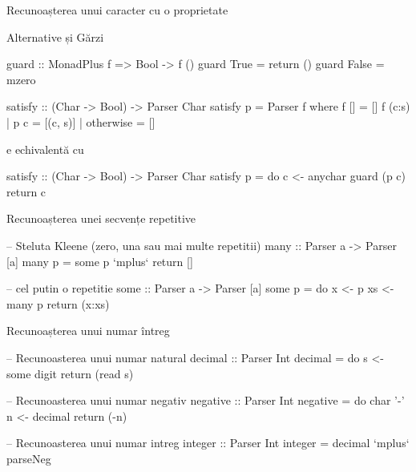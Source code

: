 \documentclass[xcolor=x11names,compress,10pt]{beamer}
\begin{document}
\begin{frame}[fragile]{Recunoașterea unui caracter cu o proprietate}
\begin{block}{Alternative și Gărzi}
\begin{asciihs}
guard :: MonadPlus f => Bool -> f ()
guard True = return ()
guard False = mzero
\end{asciihs}
\end{block}
\begin{asciihs}
  satisfy :: (Char -> Bool) -> Parser Char
  satisfy p = Parser f
    where
    f []                 = []
    f (c:s) | p c        = [(c, s)]
            | otherwise = []
\end{asciihs}
e echivalentă cu
\begin{asciihs}
  satisfy :: (Char -> Bool) -> Parser Char
  satisfy p = do   c <- anychar
                   guard (p c)
                   return c
\end{asciihs}

\end{frame}

\begin{frame}[fragile]{Recunoașterea unei secvențe repetitive}
\begin{asciihs}
  -- Steluta Kleene (zero, una sau mai multe repetitii)
  many :: Parser a -> Parser [a]
  many p  =  some p   `mplus`   return []

  -- cel putin o repetitie
  some :: Parser a -> Parser [a]
  some p = do   x <- p
                xs <- many p
                return (x:xs)
\end{asciihs}
\end{frame}



\begin{frame}[fragile]{Recunoașterea unui numar întreg}
\begin{asciihs}
  -- Recunoasterea unui numar natural
  decimal :: Parser Int
  decimal = do  s <- some digit
                return (read s)

  -- Recunoasterea unui numar negativ
  negative :: Parser Int
  negative = do   char '-'
                  n <- decimal
                  return (-n)

  -- Recunoasterea unui numar intreg
  integer :: Parser Int
  integer = decimal `mplus` parseNeg
\end{asciihs}
\end{frame}


\end{document}
